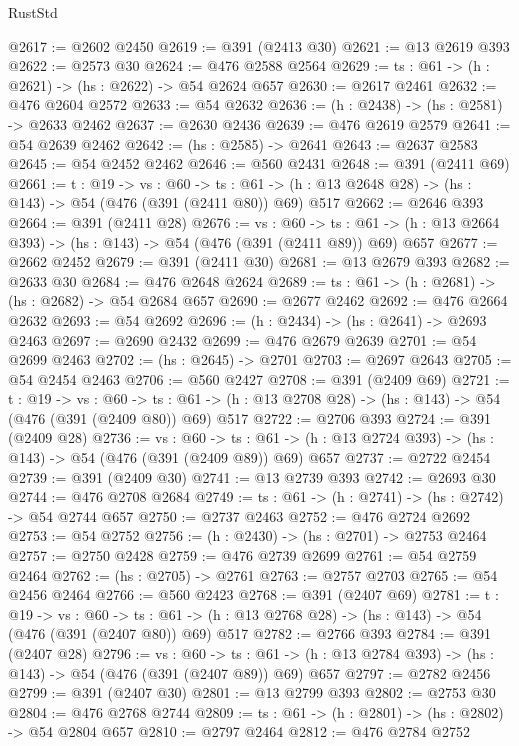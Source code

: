 \begin{lexlean}{RustStd}
\begin{coremodule}
@2617 := @2602 @2450
@2619 := @391 (@2413 @30)
@2621 := @13 @2619 @393
@2622 := @2573 @30
@2624 := @476 @2588 @2564
@2629 := {ts : @61} -> (h : @2621) -> (hs : @2622) -> @54 @2624 @657
@2630 := @2617 @2461
@2632 := @476 @2604 @2572
@2633 := @54 @2632
@2636 := (h : @2438) -> (hs : @2581) -> @2633 @2462
@2637 := @2630 @2436
@2639 := @476 @2619 @2579
@2641 := @54 @2639 @2462
@2642 := (hs : @2585) -> @2641
@2643 := @2637 @2583
@2645 := @54 @2452 @2462
@2646 := @560 @2431
@2648 := @391 (@2411 @69)
@2661 := {t : @19} ->
  {vs : @60} ->
  {ts : @61} -> (h : @13 @2648 @28) -> (hs : @143) -> @54 (@476 (@391 (@2411 @80)) @69) @517
@2662 := @2646 @393
@2664 := @391 (@2411 @28)
@2676 := {vs : @60} ->
  {ts : @61} -> (h : @13 @2664 @393) -> (hs : @143) -> @54 (@476 (@391 (@2411 @89)) @69) @657
@2677 := @2662 @2452
@2679 := @391 (@2411 @30)
@2681 := @13 @2679 @393
@2682 := @2633 @30
@2684 := @476 @2648 @2624
@2689 := {ts : @61} -> (h : @2681) -> (hs : @2682) -> @54 @2684 @657
@2690 := @2677 @2462
@2692 := @476 @2664 @2632
@2693 := @54 @2692
@2696 := (h : @2434) -> (hs : @2641) -> @2693 @2463
@2697 := @2690 @2432
@2699 := @476 @2679 @2639
@2701 := @54 @2699 @2463
@2702 := (hs : @2645) -> @2701
@2703 := @2697 @2643
@2705 := @54 @2454 @2463
@2706 := @560 @2427
@2708 := @391 (@2409 @69)
@2721 := {t : @19} ->
  {vs : @60} ->
  {ts : @61} -> (h : @13 @2708 @28) -> (hs : @143) -> @54 (@476 (@391 (@2409 @80)) @69) @517
@2722 := @2706 @393
@2724 := @391 (@2409 @28)
@2736 := {vs : @60} ->
  {ts : @61} -> (h : @13 @2724 @393) -> (hs : @143) -> @54 (@476 (@391 (@2409 @89)) @69) @657
@2737 := @2722 @2454
@2739 := @391 (@2409 @30)
@2741 := @13 @2739 @393
@2742 := @2693 @30
@2744 := @476 @2708 @2684
@2749 := {ts : @61} -> (h : @2741) -> (hs : @2742) -> @54 @2744 @657
@2750 := @2737 @2463
@2752 := @476 @2724 @2692
@2753 := @54 @2752
@2756 := (h : @2430) -> (hs : @2701) -> @2753 @2464
@2757 := @2750 @2428
@2759 := @476 @2739 @2699
@2761 := @54 @2759 @2464
@2762 := (hs : @2705) -> @2761
@2763 := @2757 @2703
@2765 := @54 @2456 @2464
@2766 := @560 @2423
@2768 := @391 (@2407 @69)
@2781 := {t : @19} ->
  {vs : @60} ->
  {ts : @61} -> (h : @13 @2768 @28) -> (hs : @143) -> @54 (@476 (@391 (@2407 @80)) @69) @517
@2782 := @2766 @393
@2784 := @391 (@2407 @28)
@2796 := {vs : @60} ->
  {ts : @61} -> (h : @13 @2784 @393) -> (hs : @143) -> @54 (@476 (@391 (@2407 @89)) @69) @657
@2797 := @2782 @2456
@2799 := @391 (@2407 @30)
@2801 := @13 @2799 @393
@2802 := @2753 @30
@2804 := @476 @2768 @2744
@2809 := {ts : @61} -> (h : @2801) -> (hs : @2802) -> @54 @2804 @657
@2810 := @2797 @2464
@2812 := @476 @2784 @2752

\end{coremodule}
\end{lexlean}
